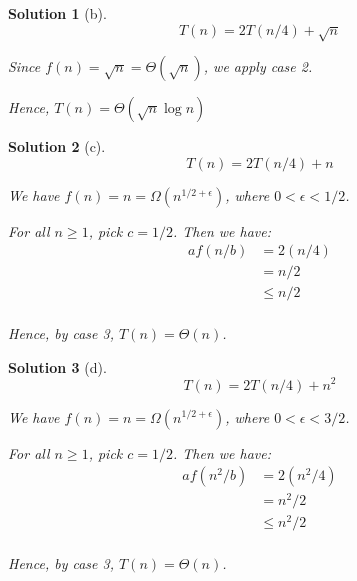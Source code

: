 \documentclass[letterpaper, 11pt]{article}
\theoremstyle{mystyle}
\newtheorem*{sln}{Solution}
\begin{document}
\begin{sln}[b]
    \[T(n) = 2T(n/4) + \sqrt{n}\]

    Since $f(n) = \sqrt{n} = \Theta (\sqrt{n})$, we apply case 2.

    Hence, $T(n) = \Theta (\sqrt{n} \log n)$
\end{sln}

\begin{sln}[c]
    \[T(n) = 2T(n/4) + n\]

    We have $f(n) = n = \Omega (n^{1/2+\epsilon})$, where $0 <\epsilon < 1/2$. 

    For all $n \geq 1$, pick $c = 1/2$. Then we have:
    \begin{align*}
        af(n/b) & = 2(n/4) \\
                & = n/2 \\
                & \leq n/2 \\
    \end{align*}

    Hence, by case 3, $T(n) = \Theta(n)$.
\end{sln}

\begin{sln}[d]
    \[T(n) = 2T(n/4) + n^2 \]

    We have $f(n) = n = \Omega (n^{1/2+\epsilon})$, where $0 <\epsilon < 3/2$.

    For all $n \geq 1$, pick $c = 1/2$. Then we have:
    \begin{align*}
        af(n^2/b)   & = 2(n^2/4) \\
                    & = n^2/2 \\
                    & \leq n^2/2 \\
    \end{align*}

    Hence, by case 3, $T(n) = \Theta(n)$. 
\end{sln}
\end{document}
